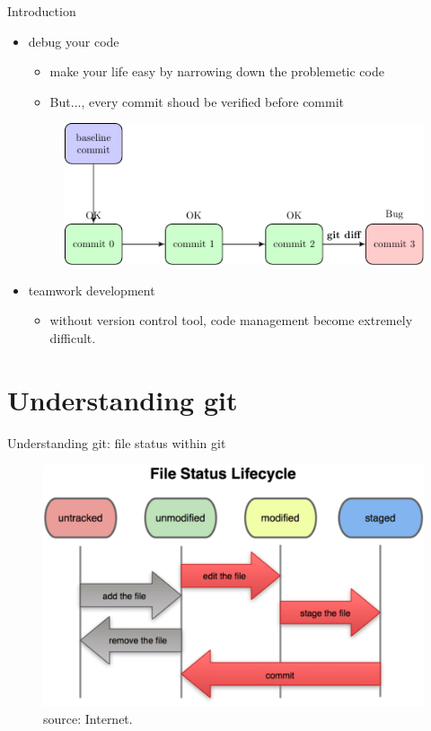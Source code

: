 \documentclass{beamer}
\begin{document}
\begin{frame}{Introduction}
    \begin{itemize}
      \item debug your code
        \begin{itemize}
            \item make your life easy by narrowing down the problemetic code      
            \item But..., every commit shoud be verified before commit        
        \end{itemize}          
        \begin{figure}
        \includegraphics[width=.7\textwidth]{figures/debugversioncontrol.pdf}
        \end{figure}         
     \item teamwork development
        \begin{itemize}
            \item without version control tool, code management become extremely difficult.
        \end{itemize}          
    \end{itemize} 
\end{frame}

\section{Understanding git}
\begin{frame}{Understanding git: file status within git}
    \begin{figure}
    \includegraphics[width=.7\textwidth]{figures/gitlifestyle.png}
    \caption{\label{git life cycle} source: Internet.}
    \end{figure}             
\end{frame}
\end{document}
